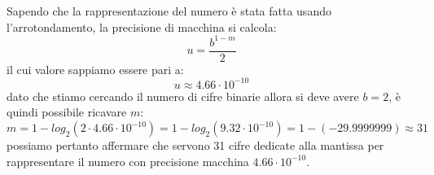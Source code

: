 Sapendo che la rappresentazione del numero è stata fatta usando l'arrotondamento, la precisione di macchina si calcola:
\[
u = \frac{b^{1-m}}{2}
\]
il cui valore sappiamo essere pari a:
\[
u \approx 4.66 \cdot 10^{-10}
\]
dato che stiamo cercando il numero di cifre binarie allora si deve avere $b=2$, è quindi possibile ricavare $m$:
\[
m = 1- log_2{(2\cdot 4.66 \cdot 10 ^{-10})} = 1 - log_2{(9.32 \cdot 10^{-10})} = 1 - (-29.9999999) \approx 31
\]
possiamo pertanto affermare che servono 31 cifre dedicate alla mantissa per rappresentare il numero con precisione macchina \(4.66 \cdot 10^{-10}\).